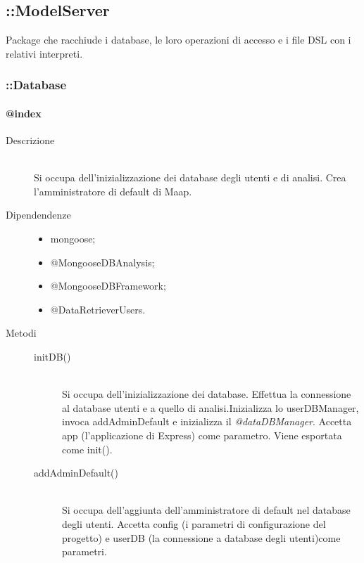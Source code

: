 \subsection{::ModelServer}
Package che racchiude i database, le loro operazioni di accesso e i file 
DSL con i relativi interpreti.

\subsubsection{::Database}
\paragraph{@index}
\begin{description}
 \item[Descrizione] \hfill \\
 Si occupa dell'inizializzazione dei database degli utenti e di analisi. Crea l'amministratore di default di Maap.
 \item[Dipendendenze] \hfill
   \begin{itemize}
   \item mongoose;
   \item @MongooseDBAnalysis;
   \item @MongooseDBFramework;
   \item @DataRetrieverUsers.
   \end{itemize}
 \item[Metodi] \hfill
 \begin{description}
 \item[initDB()] \hfill \\
 Si occupa dell'inizializzazione dei database. Effettua la connessione al database utenti e a quello di analisi.Inizializza lo userDBManager, invoca addAdminDefault e inizializza il \textit{@dataDBManager}. Accetta app (l'applicazione di Express) come parametro. Viene esportata come init().
  \item[addAdminDefault()] \hfill \\
  Si occupa dell'aggiunta dell'amministratore di default nel database degli utenti. Accetta config (i parametri di configurazione del progetto) e userDB (la connessione a database degli utenti)come parametri.
 \end{description}
\end{description}

